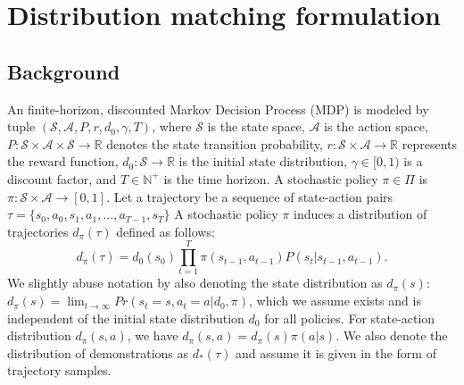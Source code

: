 \section{Distribution matching formulation}

\subsection{Background}
An finite-horizon, discounted Markov Decision Process (MDP) is modeled by tuple $(\mathcal{S} , \mathcal{A}, P, r , d_0, \gamma, T)$, where $\mathcal{S}$ is the state space, $\mathcal{A}$ is the action space, $P:\mathcal{S}\times\mathcal{A}\times\mathcal{S}\rightarrow \mathbb{R}$ denotes the state transition probability, $r:\mathcal{S}\times\mathcal{A}\rightarrow\mathbb{R}$ represents the reward function, $d_0:\mathcal{S} \rightarrow\mathbb{R}$ is the initial state distribution, $\gamma\in[0, 1)$ is a discount factor, and $T\in \mathbb{N}^+$ is the time horizon.
A stochastic policy $\pi\in\Pi$ is $\pi: \mathcal{S}\times\mathcal{A}\rightarrow [0, 1]$.
Let a trajectory be a sequence of state-action pairs $\tau=\{s_0, a_0, s_1, a_1, ..., a_{T-1}, s_T\}$
A stochastic policy $\pi$ induces a  distribution of trajectories $d_{\pi}(\tau)$ defined as follows:
\begin{equation}\label{equ:d_pi_definition}
d_{\pi}(\tau) = d_0(s_0)\prod_{t=1}^{T}\pi(s_{t-1}, a_{t-1})P(s_{t}|s_{t-1}, a_{t-1}). 
\end{equation}
We slightly abuse notation by also denoting the state distribution as $d_\pi(s)$: $d_{\pi}(s) =\lim_{t\rightarrow\infty}Pr(s_t=s, a_t=a|d_0, \pi)$, 
which we assume exists and is independent of the initial state distribution $d_0$ for all policies. 
For state-action distribution $d_{\pi}(s, a)$, we have $d_{\pi}(s, a) = d_{\pi}(s)\pi(a|s)$. 
We also denote the distribution of demonstrations as $d_{*}(\tau)$ and assume it is given in the form of trajectory samples. 

